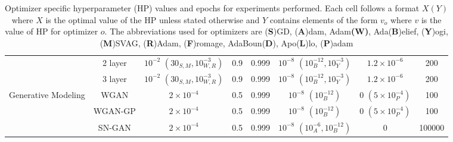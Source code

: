 \begin{table}[t]
{\begin{tabular}{cccccccc}
           
                                                 \rule{0pt}{12pt} &  2 layer &  $ 10^{-2}$ $(30_{S, M}, 10^{-3}_{W, R})$ 
                                                    & 0.9 & 0.999 & $10^{-8}$ $ (10^{-12}_{B}, 10^{-3}_{Y})$ & $1.2 \times 10^{-6}$ & 200 \\\cline{2-8} 
                                                \rule{0pt}{12pt} &  3 layer &  $10^{-2}$  $(30_{S, M}, 10^{-3}_{W, R})$ 
                                                    & 0.9 & 0.999 & $10^{-8}$ $ (10^{-12}_{B}, 10^{-3}_{Y})$ & $1.2 \times 10^{-6}$ & 200 \\
            \hline
            \multirow{3}{*}{Generative Modeling}
                                                \rule{0pt}{12pt} &  WGAN &  $2\times10^{-4}$ 
                                                    & 0.5 & 0.999 & $10^{-8}$ $ (10^{-12}_{B})$ & $0$ $(5 \times 10^{-4}_{P})$ & 100 \\\cline{2-8} 
                                                \rule{0pt}{12pt} &  WGAN-GP &  $2\times10^{-4}$ 
                                                    & 0.5 & 0.999 & $10^{-8}$ $(10^{-12}_{B})$ & $0$ $(5 \times 10^{-4}_{P})$ & 100 \\\cline{2-8} 
                                                \rule{0pt}{12pt} &  SN-GAN &  $2\times10^{-4}$ 
                                                    & 0.5 & 0.999 & $10^{-8}$ $ (10^{-6}_{A}, 10^{-12}_{B})$ & $0$ & 100000 \\
            
            \hline

        \end{tabular}}
    \vspace{2mm}
    \caption{Optimizer specific hyperparameter (HP) values and epochs for experiments performed. Each cell follows a format $X (Y)$ where $X$ is the optimal value of the HP unless stated otherwise and $Y$ contains elements of the form $v_o$ where $v$ is the value of HP for optimizer $o$. The abbreviations used for optimizers are (\textbf{S})GD,
(\textbf{A})dam, Adam\textbf{(W)}, Ada(\textbf{B})elief, (\textbf{Y})ogi,
(\textbf{M})SVAG, (\textbf{R})Adam, (\textbf{F})romage, AdaBoun(\textbf{D}), Apo(\textbf{L})lo, (\textbf{P})adam}
\label{table:hyperparam}
\end{table}


